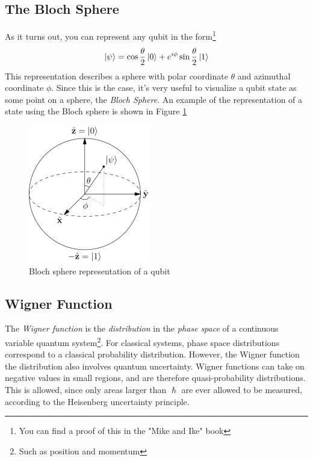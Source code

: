 \subsection{The Bloch Sphere}
As it turns out, you can represent any qubit in the form\footnote{You can find a proof of this in the "Mike and Ike" book}
\[
    \ket{\psi} = \cos{\frac{\theta}{2}}\ket{0} + e^{i \phi} \sin{\frac{\theta}{2}}\ket{1}
\]
This representation describes a sphere with polar coordinate $\theta$ and azimuthal coordinate $\phi$. Since this is the case, it's very useful to visualize a qubit state as some point on a sphere, the \textit{Bloch Sphere}. An example of the representation of a state using the Bloch sphere is shown in Figure \ref{fig:Bloch-Sphere}
\begin{figure}[H]
    \centering
    \includegraphics[width=0.4\columnwidth]{gfx/Bloch.png}
    \caption{Bloch sphere representation of a qubit}
    \label{fig:Bloch-Sphere}
\end{figure}

\subsection{Wigner Function}
The \textit{Wigner function} is the \textit{distribution} in the \textit{phase space} of a continuous variable quantum system\footnote{Such as position and momentum}. For classical systems, phase space distributions correspond to a classical probability distribution. However, the Wigner function the distribution also involves quantum uncertainty. Wigner functions can take on negative values in small regions, and are therefore quasi-probability distributions. This is allowed, since only areas larger than $\hslash$ are ever allowed to be measured, according to the Heisenberg uncertainty principle.

